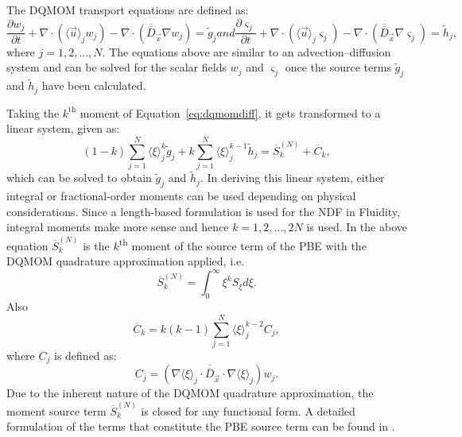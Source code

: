 The DQMOM transport equations are defined as:
\begin{subequations}
\begin{equation} \label{eq:dqmomweight}
\frac{\partial w_{j}}{\partial t} + \nabla \cdot \left( \langle \vec{u} \rangle_j w_j \right) - \nabla \cdot \left( \overline{\overline{D}}_{\vec{x}} \nabla w_j \right) = \widetilde{g}_{j}
\end{equation}
and 
\begin{equation} \label{eq:dqmomweightabscissa}
\frac{\partial \varsigma_{j}}{\partial t} + \nabla \cdot \left( \langle \vec{u} \rangle_j \varsigma_j \right) - \nabla \cdot \left( \overline{\overline{D}}_{\vec{x}} \nabla \varsigma_j \right)  = \widetilde{h}_{j},
\end{equation}
\end{subequations}
where $j=1,2,...,N$. 
The equations above are similar to an advection--diffusion system and can be solved for the scalar fields $w_j$ and $\varsigma_j$ once the source terms $\widetilde{g}_{j}$ and $\widetilde{h}_{j}$ have been calculated. 

Taking the $k^{\textrm{th}}$ moment of Equation~\eqref{eq:dqmomdiff}, it gets transformed to a linear system, given as:
\begin{equation} \label{eq:dqmom_lineq_raw}
(1-k) \sum_{j=1}^N \langle \xi \rangle_{j}^k \widetilde{g}_{j} + k \sum_{j=1}^N \langle \xi \rangle_{j}^{k-1} \widetilde{h}_{j} = \overline{S}_k^{(N)} + \overline{C}_k,
\end{equation}
which can be solved to obtain $\widetilde{g}_{j}$ and $\widetilde{h}_{j}$. In deriving this linear system, either integral or fractional-order moments can be used depending on physical considerations. Since a length-based formulation is used for the NDF in Fluidity, integral moments make more sense and hence $k=1,2,...,2N$ is used.
In the above equation $\overline{S}_k^{(N)}$ is the $k$\textsuperscript{th} moment of the source term of the PBE with the DQMOM quadrature approximation applied, i.e.
\begin{equation}
\overline{S}_k^{(N)} = \int_{0}^{\infty} \xi^k S_{\xi} d\xi.
\label{eq:source_moment}
\end{equation}
Also
\begin{equation}
\overline{C}_k = k(k-1) \sum_{j=1}^N \langle \xi \rangle_{j}^{k-2} C_{j},
\end{equation}
where $C_j$ is defined as:
\begin{equation}
C_j =\left( \nabla \langle \xi \rangle_j \cdot \overline{\overline{D}}_{\vec{x}} \cdot \nabla \langle \xi \rangle_j \right) w_j.
\end{equation}
Due to the inherent nature of the DQMOM quadrature approximation, the moment source term $\overline{S}_k^{(N)}$ is closed for any functional form.
A detailed formulation of the terms that constitute the PBE source term can be found in \citet{bhutani2016}. 

